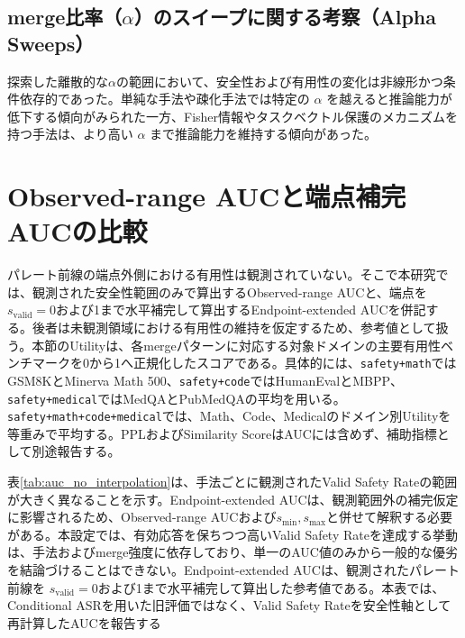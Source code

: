 \documentclass{article}
\begin{document}
\subsection{merge比率（$\alpha$）のスイープに関する考察（Alpha Sweeps）}
探索した離散的な\(\alpha\)の範囲において、安全性および有用性の変化は非線形かつ条件依存的であった。単純な手法や疎化手法では特定の $\alpha$ を越えると推論能力が低下する傾向がみられた一方、Fisher情報やタスクベクトル保護のメカニズムを持つ手法は、より高い $\alpha$ まで推論能力を維持する傾向があった。

\section{Observed-range AUCと端点補完AUCの比較}
\label{app:observed_range_auc}
パレート前線の端点外側における有用性は観測されていない。そこで本研究では、観測された安全性範囲のみで算出するObserved-range AUCと、端点を\(s_{\mathrm{valid}}=0\)および1まで水平補完して算出するEndpoint-extended AUCを併記する。後者は未観測領域における有用性の維持を仮定するため、参考値として扱う。本節のUtilityは、各mergeパターンに対応する対象ドメインの主要有用性ベンチマークを0から1へ正規化したスコアである。具体的には、\texttt{safety+math}ではGSM8KとMinerva Math 500、\texttt{safety+code}ではHumanEvalとMBPP、\texttt{safety+medical}ではMedQAとPubMedQAの平均を用いる。\texttt{safety+math+code+medical}では、Math、Code、Medicalのドメイン別Utilityを等重みで平均する。PPLおよびSimilarity ScoreはAUCには含めず、補助指標として別途報告する。

表\ref{tab:auc_no_interpolation}は、手法ごとに観測されたValid Safety Rateの範囲が大きく異なることを示す。Endpoint-extended AUCは、観測範囲外の補完仮定に影響されるため、Observed-range AUCおよび\(s_{\min}, s_{\max}\)と併せて解釈する必要がある。本設定では、有効応答を保ちつつ高いValid Safety Rateを達成する挙動は、手法およびmerge強度に依存しており、単一のAUC値のみから一般的な優劣を結論づけることはできない。Endpoint-extended AUCは、観測されたパレート前線を \(s_{\mathrm{valid}}=0\)および1まで水平補完して算出した参考値である。本表では、Conditional ASRを用いた旧評価ではなく、Valid Safety Rateを安全性軸として再計算したAUCを報告する
\end{document}
